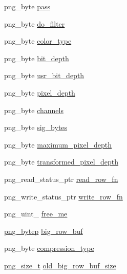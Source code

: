 \begin{DoxyCompactItemize}
\item 
png\+\_\+byte \mbox{\hyperlink{structpng__struct__def_a61226f1790d295a85fdd0ca8c195469c}{pass}}
\item 
png\+\_\+byte \mbox{\hyperlink{structpng__struct__def_abcbabd6f1568b3924af91556371d7b73}{do\+\_\+filter}}
\item 
png\+\_\+byte \mbox{\hyperlink{structpng__struct__def_a01e64966deb22a659cce371cbf6af666}{color\+\_\+type}}
\item 
png\+\_\+byte \mbox{\hyperlink{structpng__struct__def_a8a18c35f00b4dff31c12306156f01ce3}{bit\+\_\+depth}}
\item 
png\+\_\+byte \mbox{\hyperlink{structpng__struct__def_af30e53e1cad0830302030152c81cc59f}{usr\+\_\+bit\+\_\+depth}}
\item 
png\+\_\+byte \mbox{\hyperlink{structpng__struct__def_ac7a7265bc00d1fd48a8eb20727f53fa1}{pixel\+\_\+depth}}
\item 
png\+\_\+byte \mbox{\hyperlink{structpng__struct__def_a6cc1ac2587b192b7220639ab719f2b73}{channels}}
\item 
png\+\_\+byte \mbox{\hyperlink{structpng__struct__def_a019243f63de45bd677d23f8ed533679d}{sig\+\_\+bytes}}
\item 
png\+\_\+byte \mbox{\hyperlink{structpng__struct__def_aab7b84c6ccac540be5df26a81654a009}{maximum\+\_\+pixel\+\_\+depth}}
\item 
png\+\_\+byte \mbox{\hyperlink{structpng__struct__def_aa4e37c14d96c7057389a7cb2ca839290}{transformed\+\_\+pixel\+\_\+depth}}
\item 
png\+\_\+read\+\_\+status\+\_\+ptr \mbox{\hyperlink{structpng__struct__def_a0d67c044d4088f4673b90c2109ff94c0}{read\+\_\+row\+\_\+fn}}
\item 
png\+\_\+write\+\_\+status\+\_\+ptr \mbox{\hyperlink{structpng__struct__def_a1ea44e185e0f8bdd7299f93fd017c32c}{write\+\_\+row\+\_\+fn}}
\item 
png\+\_\+uint\+\_ \mbox{\hyperlink{structpng__struct__def_a610bea16ff780c149d2756b60d2e6087}{free\+\_\+me}}
\item 
\mbox{\hyperlink{pngconf_8h_a759e1c893f977ec7b67820bc3ca37524}{png\+\_\+bytep}} \mbox{\hyperlink{structpng__struct__def_a7248deb9bb1525d1d16ee9d6187128b9}{big\+\_\+row\+\_\+buf}}
\item 
png\+\_\+byte \mbox{\hyperlink{structpng__struct__def_ad448c2648c447212ff66a0ec48cf1394}{compression\+\_\+type}}
\item 
\mbox{\hyperlink{pngconf_8h_a975e35d0a699ea3b08b8feef90fd29eb}{png\+\_\+size\+\_\+t}} \mbox{\hyperlink{structpng__struct__def_a42a732b3edf3c2fae816610beb949cc5}{old\+\_\+big\+\_\+row\+\_\+buf\+\_\+size}}

\end{DoxyCompactItemize}
